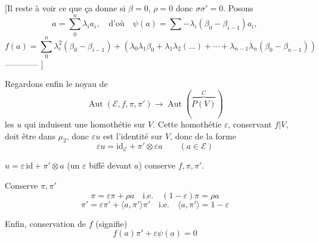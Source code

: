 \documentclass[11pt,a4paper]{article}
\begin{document}
[Il reste à voir ce que ça donne si $\beta = 0$, $\rho = 0$ donc
$\sigma \sigma' = 0$. Posons
\[
a = \sum_{0}^{n} \lambda_i a_i, \quad \text{d'où} \quad
\psi(a) = \sum -\lambda_i (\beta_0 - \beta_{i-1}) a_i,
\]
\[
f(a) = \sum_{0}^{n} \lambda_i^{2} (\beta_0 - \beta_{i-1}) + (\lambda_0
\lambda_1 \beta_0 + \lambda_1 \lambda_2 (\ldots) + \cdots + \lambda_{n-1}
\lambda_n (\beta_0 - \beta_{n-1}))
\]
———— ]

Regardons enfin le noyau de
\[
\operatorname{Aut}(\mathcal{E}, f, \pi, \pi') \longrightarrow
\operatorname{Aut}(\overset{C}{\overbrace{P(V)}})
\]
\ill{} les $u$ \ill{} \ill{} qui induisent une homothétie sur $V$. Cette
homothétie $\varepsilon$, conservant $f \vert V$, doit être dans $\mu_2$,
donc $\varepsilon u$  est l'identité sur $V$, donc de la forme
\[
\varepsilon u = \mathrm{id}_{\mathcal{E}} +
\pi' \otimes \varepsilon a \qquad (a \in \mathcal{E})
\]


 $u = \varepsilon\,\mathrm{id} + \pi' \otimes a$ (un $\varepsilon$ biffé devant $a$)
\quad conserve $f, \pi, \pi'$.

Conserve $\pi, \pi'$
\[
\pi = \varepsilon \pi + \rho a \quad \text{i.e.} \quad
\boxed{(1 - \varepsilon)\pi = \rho a}
\]
\[
\pi' = \varepsilon \pi' + \langle a, \pi' \rangle \pi'
\quad \text{i.e.} \quad
\boxed{\langle a, \pi' \rangle = 1 - \varepsilon}
\]

Enfin, conservation de $f$ \add{\ill{}} (signifie)
\[
\boxed{f(a)\pi' + \varepsilon \psi(a) = 0}
\]
\end{document}
